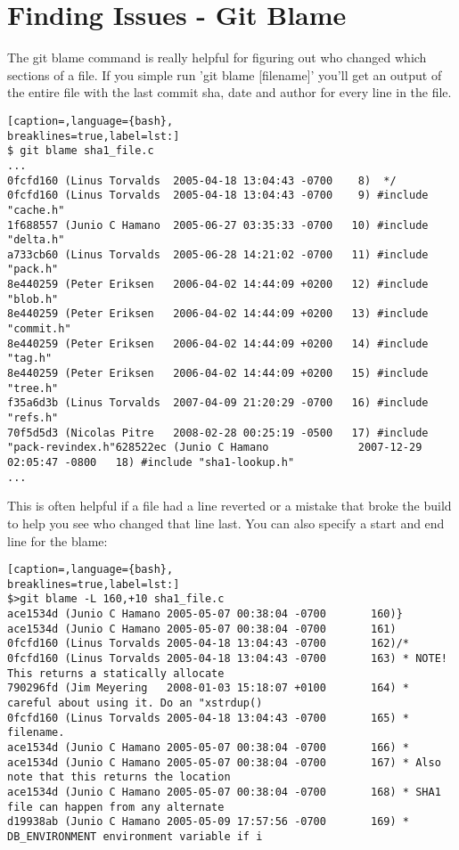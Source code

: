 \section{Finding Issues - Git Blame}
The git blame command is really helpful for figuring out who changed which
sections of a file. If you simple run 'git blame [filename]' you'll get an
output of the entire file with the last commit sha, date and author for every
line in the file.
\lstset{basicstyle=\scriptsize, numbers=none, captionpos=b, tabsize=4}
\begin{lstlisting}[caption=,language={bash},
breaklines=true,label=lst:]
$ git blame sha1_file.c
...
0fcfd160 (Linus Torvalds  2005-04-18 13:04:43 -0700    8)  */
0fcfd160 (Linus Torvalds  2005-04-18 13:04:43 -0700    9) #include "cache.h"
1f688557 (Junio C Hamano  2005-06-27 03:35:33 -0700   10) #include "delta.h"
a733cb60 (Linus Torvalds  2005-06-28 14:21:02 -0700   11) #include "pack.h"
8e440259 (Peter Eriksen   2006-04-02 14:44:09 +0200   12) #include "blob.h"
8e440259 (Peter Eriksen   2006-04-02 14:44:09 +0200   13) #include "commit.h"
8e440259 (Peter Eriksen   2006-04-02 14:44:09 +0200   14) #include "tag.h"
8e440259 (Peter Eriksen   2006-04-02 14:44:09 +0200   15) #include "tree.h"
f35a6d3b (Linus Torvalds  2007-04-09 21:20:29 -0700   16) #include "refs.h"
70f5d5d3 (Nicolas Pitre   2008-02-28 00:25:19 -0500   17) #include "pack-revindex.h"628522ec (Junio C Hamano              2007-12-29 02:05:47 -0800   18) #include "sha1-lookup.h"
...
\end{lstlisting}

This is often helpful if a file had a line reverted or a mistake that broke the
build to help you see who changed that line last.  You can also specify a start
and end line for the blame:
\lstset{basicstyle=\scriptsize, numbers=none, captionpos=b, tabsize=4}
\begin{lstlisting}[caption=,language={bash},
breaklines=true,label=lst:]
$>git blame -L 160,+10 sha1_file.c 
ace1534d (Junio C Hamano 2005-05-07 00:38:04 -0700       160)}
ace1534d (Junio C Hamano 2005-05-07 00:38:04 -0700       161)
0fcfd160 (Linus Torvalds 2005-04-18 13:04:43 -0700       162)/*
0fcfd160 (Linus Torvalds 2005-04-18 13:04:43 -0700       163) * NOTE! This returns a statically allocate
790296fd (Jim Meyering   2008-01-03 15:18:07 +0100       164) * careful about using it. Do an "xstrdup()
0fcfd160 (Linus Torvalds 2005-04-18 13:04:43 -0700       165) * filename.
ace1534d (Junio C Hamano 2005-05-07 00:38:04 -0700       166) *
ace1534d (Junio C Hamano 2005-05-07 00:38:04 -0700       167) * Also note that this returns the location
ace1534d (Junio C Hamano 2005-05-07 00:38:04 -0700       168) * SHA1 file can happen from any alternate 
d19938ab (Junio C Hamano 2005-05-09 17:57:56 -0700       169) * DB_ENVIRONMENT environment variable if i
\end{lstlisting}
